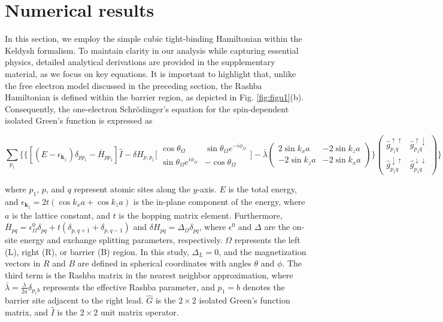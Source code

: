 \documentclass[10pt,pr,twocolumn,showpacs,amssymb,floatfix,superscriptaddress]{revtex4-1}
\newcommand{\dna}{\downarrow}
\newcommand{\para}{\parallel}
\newcommand{\upa}{\uparrow}
\newcommand{\dlt}{\delta}
\newcommand{\Dlt}{\Delta}
\newcommand{\eps}{\epsilon}
\newcommand{\Og}{\Omega}
\begin{document}
\section{Numerical results}\label{sec:sec2}
In this section, we employ the simple cubic tight-binding Hamiltonian within the Keldysh formalism. To maintain clarity in our analysis while capturing essential physics, detailed analytical derivations are provided in the supplementary material, as we focus on key equations. It is important to highlight that, unlike the free electron model discussed in the preceding section, the Rashba Hamiltonian is defined within the barrier region, as depicted in Fig. \ref{fig:figu1}(b). Consequently, the one-electron Schr\"odinger's equation for the spin-dependent isolated Green's function is expressed as
\begin{widetext}
\begin{equation}
\sum_{p_1} \Bigg \{ \bigg\{ [(E-\eps_{\bm{k}_{||}})\dlt_{pp_1}-\overline{H}_{pp_1}]\hat{I}-\dlt H_{p,p_1} \bigg[\begin{array}{ccc}\cos\theta_\Og & \sin\theta_\Og e^{-i\phi_\Og} \\
\sin\theta_\Og e^{i\phi_\Og} & -\cos\theta_\Og 
 \end{array} \bigg] -  \bar{\lambda} \left(\begin{array}{cc} 
2\sin k_xa  &  -2\sin k_za\\
-2\sin k_za &  -2\sin k_xa
\end{array}\right) \bigg \} \left(\begin{array}{cc} \hat{g}^{\upa\upa}_{p_1q}  &  \hat{g}^{\upa\dna}_{p_1q} \\  \hat{g}^{\dna\upa}_{p_1q} &  \hat{g}^{\dna\dna}_{p_1q} \end{array}\right)  \Bigg \}=\dlt_{pq}\hat{I},
 \label{tbschrodinger}
\end{equation}
\end{widetext} 
where $p_1$, $p$, and $q$ represent atomic sites along the $y$-axis. $E$ is the total energy, and $\eps_{\bm k_\para} = 2t(\cos k_x a + \cos k_z a)$ is the in-plane component of the energy, where $a$ is the lattice constant, and $t$ is the hopping matrix element. Furthermore,  $\overline{H}_{pq} = \eps^0_\Omega\delta_{pq} + t(\delta_{p,q+1}+\delta_{p,q-1})$ and $\delta H_{pq}= \Delta_\Omega \delta_{pq}$, 
where $\eps^0$ and $\Dlt$ are the on-site energy and exchange splitting parameters, respectively.  $\Omega$ represents the left (L), right (R), or barrier (B) region. In this study, $\Delta_L = 0$, and the magnetization vectors in $R$ and $B$ are defined in spherical coordinates with angles $\theta$ and $\phi$. The third term is the Rashba matrix in the nearest neighbor approximation, where $\bar{\lambda} = \frac{\lambda}{2a}\delta_{p_1b}$ represents the effective Rashba parameter, and $p_1=b$ denotes the barrier site adjacent to the right lead. $\hat{G}$ is the $2\times2$ isolated Green's function matrix, and $\hat{I}$ is the $2\times2$ unit matrix operator. 
\end{document}
